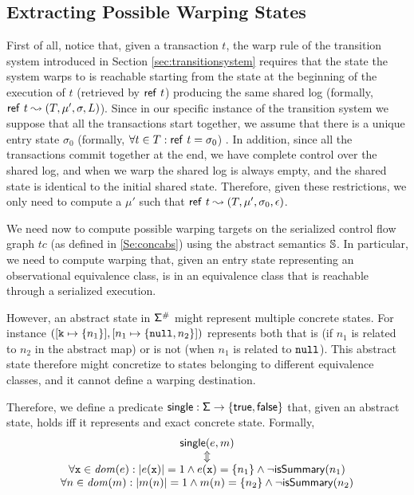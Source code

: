 \subsection{Extracting Possible Warping States}
First of all, notice that, given a transaction $t$, the {\sf warp} rule of the transition system introduced in Section \ref{sec:transitionsystem} requires that the state the system warps to is reachable starting from the state at the beginning of the execution of $t$ (retrieved by ${\sf ref}\ t$) producing the same shared log (formally, ${\sf ref}\ t \leadsto (T,\mu', \sigma, L)$). Since in our specific instance of the transition system we suppose that all the transactions start together, we assume that there is a unique entry state $\sigma_0$ (formally, $\forall t \in T : {\sf ref}\ t=\sigma_0$) . In addition, since all the transactions commit together at the end, we have complete control over the shared log, and when we warp the shared log is always empty, and the shared state is identical to the initial shared state. Therefore, given these restrictions, we only need to compute a $\mu'$ such that ${\sf ref}\ t \leadsto (T,\mu', \sigma_0, \epsilon)$.

We need now to compute possible warping targets on the serialized control flow graph $tc$ (as defined in \ref{Se:concabs}) using the abstract semantics $\mathbb{S}$. In particular, we need to compute warping that, given an entry state representing an observational equivalence class, is in an equivalence class that is reachable through a serialized execution. 

However, an abstract state in $\mathsf{\Sigma}^\#$ might represent multiple concrete states. For instance $([\mathtt{k} \mapsto \{n_1\}], [n_1 \mapsto \{\mathtt{null}, n_2\}])$ represents both that   is (if $n_1$ is related to $n_2$ in the abstract map) or is not (when $n_1$ is related to $\mathtt{null}$). This abstract state therefore might concretize to states belonging to different equivalence classes, and it cannot define a warping destination.

Therefore, we define a predicate $\mathsf{single} : \mathsf{\Sigma} \to \{\mathsf{true}, \mathsf{false}\}$ that, given an abstract state, holds iff it represents and exact concrete state. Formally,
\[
\begin{array}{c}
\mathsf{single}(e, m)\\
\Updownarrow\\
\forall \mathtt{x} \in \mathit{dom}(e) : |e(\mathtt{x})|=1 \land e(\mathtt{x})=\{n_1\} \land \neg \mathsf{isSummary}(n_1)\\
\forall n \in \mathit{dom}(m) : |m(n)|=1 \land m(n)=\{n_2\} \land \neg \mathsf{isSummary}(n_2)\\
\end{array}
\]

